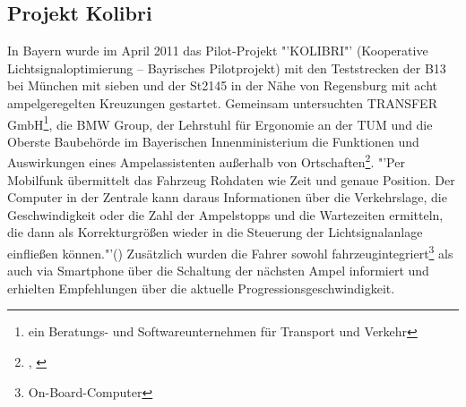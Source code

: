 \subsection{Projekt Kolibri}
In Bayern wurde im April 2011 das Pilot-Projekt "'KOLIBRI"' (Kooperative Lichtsignaloptimierung -- Bayrisches Pilotprojekt) mit den Teststrecken der B13 bei München mit sieben und der St2145 in der Nähe von Regensburg mit acht ampelgeregelten Kreuzungen gestartet. Gemeinsam untersuchten TRANSFER GmbH\footnote{ ein Beratungs- und Softwareunternehmen für Transport und Verkehr}, die \gls{BMW} Group, der Lehrstuhl für Ergonomie an der \gls{TUM} und die Oberste Baubehörde im Bayerischen Innenministerium die Funktionen und Auswirkungen eines Ampelassistenten außerhalb von Ortschaften\footnote{\cite{kolibri}, \cite{kolibriTUM}}. "'Per Mobilfunk übermittelt das Fahrzeug Rohdaten wie Zeit und genaue Position. Der Computer in der Zentrale kann daraus Informationen über die Verkehrslage, die Geschwindigkeit oder die Zahl der Ampelstopps und die Wartezeiten ermitteln, die dann als Korrekturgrößen wieder in die Steuerung der Lichtsignalanlage einfließen können."'(\cite{kolibriTUM}) Zusätzlich wurden die Fahrer sowohl fahrzeugintegriert\footnote{ On-Board-Computer} als auch via Smartphone über die Schaltung der nächsten Ampel informiert und erhielten Empfehlungen über die aktuelle Progressionsgeschwindigkeit. 

